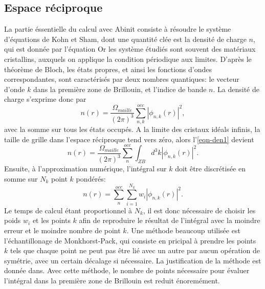 \subsection{Espace réciproque}
\label{subsec-reciprocal}
La partie éssentielle du calcul avec Abinit consiste à résoudre le système d'équations de Kohn et Sham,
dont une quantité clée est la densité de charge $n$, qui est donnée par l'équation %
Or les système étudiés sont souvent des matériaux cristallins,
auxquels on applique la condition périodique aux limites.
D'après le théorème de Bloch, les états propres, et ainsi les fonctions d'ondes correspondantes,
sont caractérisés par deux nombres quantiques:
le vecteur d'onde $k$ dans la première zone de Brillouin, et l'indice de bande $n$.
La densité de charge s'exprime donc par
\begin{equation}
  \label{eqn-den1}
  n(r) = \frac{\Omega_{maille}}{{(2\pi)}^3} \sum_{n, k}^{occ}|\phi_{n, k}(r)|^2,
\end{equation}
avec la somme sur tous les états occupés.
A la limite des cristaux idéals infinis, la taille de grille dans l'espace réciproque tend vers zéro,
alors l'\cref{eqn-den1} devient
\begin{equation}
  \label{eqn-den2}
  n(r) = \frac{\Omega_{maille}}{{(2\pi)}^3} \sum_n^{occ}\int_{ZB}d^3k|\phi_{n, k}(r)|^2.
\end{equation}
Ensuite, à l'approximation numérique,
l'intégral sur $k$ doit être discrétisée en somme sur $N_k$ point $k$ pondérés:
\begin{equation}
  \label{eqn-den3}
  n(r) = \sum_n^{occ}\sum_{i=1}^{N_k}w_i|\phi_{n, k}(r)|^2.
\end{equation}
Le temps de calcul étant proportionnel à $N_k$,
il est donc nécessaire de choisir les poids $w_i$ et les points $k$ afin de reproduire le résultat
de l'intégral avec la moindre erreur et le moindre nombre de point $k$.
Une méthode beaucoup utilisée est l'échantillonage de Monkhorst-Pack,
qui consiste en pricipal à prendre les points $k$ tels que chaque point ne peut pas être lié avec un autre par aucun opération de symétrie, %
avec un certain décalage si nécessaire.
La justification de la méthode est donnée dans. %
Avec cette méthode, le nombre de points nécessaire pour évaluer l'intégral dans la première zone de Brillouin est reduit énoremément.

